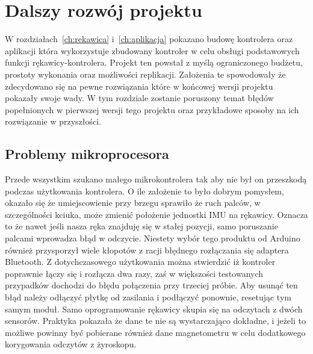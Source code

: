 \chapter{Dalszy rozwój projektu}
\label{ch:rozwoj}
 W rozdziałach~\ref{ch:rekawica} i~\ref{ch:aplikacja} pokazano budowę kontrolera oraz aplikacji która wykorzystuje zbudowany kontroler w celu obsługi podstawowych funkcji rękawicy-kontrolera. Projekt ten powstał z myślą ograniczonego budżetu, prostoty wykonania oraz możliwości replikacji. Założenia te spowodowały że zdecydowano się na pewne rozwiązania które w końcowej wersji projektu pokazały swoje wady. W tym rozdziale zostanie poruszony temat błędów popełnionych w pierwszej wersji tego projektu oraz przykładowe sposoby na ich rozwiązanie w przyszłości. 
 
 \section{Problemy mikroprocesora}
 \label{sec:iuMikroprocesor}
 Przede wszystkim szukano małego mikrokontrolera tak aby nie był on przeszkodą podczas użytkowania kontrolera. O ile założenie to było dobrym pomysłem, okazało się że umiejscowienie przy brzegu sprawiło że ruch palców, w szczególności kciuka, może zmienić położenie jednostki IMU na rękawicy. Oznacza to że nawet jeśli nasza ręka znajduję się w stałej pozycji, samo poruszanie palcami wprowadza błąd w odczycie. Niestety wybór tego produktu od Arduino również przysporzył wiele kłopotów z racji błędnego rozłączania się adaptera Bluetooth. Z dotychczasowego użytkowania można stwierdzić iż kontroler poprawnie łączy się i rozłącza dwa razy, zaś w większości testowanych przypadków dochodzi do błędu połączenia przy trzeciej próbie. Aby usunąć ten błąd należy odłączyć płytkę od zasilania i podłączyć ponownie, resetując tym samym moduł. Samo oprogramowanie rękawicy skupia się na odczytach z dwóch sensorów. Praktyka pokazała że dane te nie są wystarczająco dokładne, i jeżeli to możliwe powinny być pobierane również dane magnetometru w celu dodatkowego korygowania odczytów z żyroskopu. 
 
